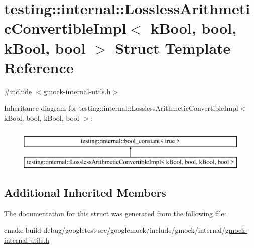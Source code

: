 \hypertarget{structtesting_1_1internal_1_1LosslessArithmeticConvertibleImpl_3_01kBool_00_01bool_00_01kBool_00_01bool_01_4}{}\section{testing\+::internal\+::Lossless\+Arithmetic\+Convertible\+Impl$<$ k\+Bool, bool, k\+Bool, bool $>$ Struct Template Reference}
\label{structtesting_1_1internal_1_1LosslessArithmeticConvertibleImpl_3_01kBool_00_01bool_00_01kBool_00_01bool_01_4}


{\ttfamily \#include $<$gmock-\/internal-\/utils.\+h$>$}

Inheritance diagram for testing\+::internal\+::Lossless\+Arithmetic\+Convertible\+Impl$<$ k\+Bool, bool, k\+Bool, bool $>$\+:\begin{figure}[H]
\begin{center}
\leavevmode
\includegraphics[height=2.000000cm]{structtesting_1_1internal_1_1LosslessArithmeticConvertibleImpl_3_01kBool_00_01bool_00_01kBool_00_01bool_01_4}
\end{center}
\end{figure}
\subsection*{Additional Inherited Members}


The documentation for this struct was generated from the following file\+:\begin{DoxyCompactItemize}
\item 
cmake-\/build-\/debug/googletest-\/src/googlemock/include/gmock/internal/\mbox{\hyperlink{gmock-internal-utils_8h}{gmock-\/internal-\/utils.\+h}}\end{DoxyCompactItemize}
